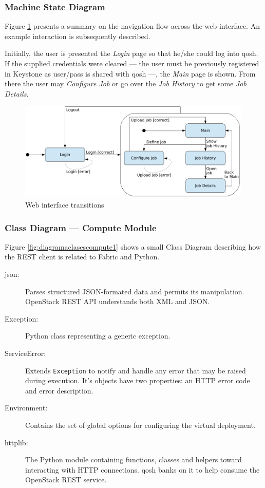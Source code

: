 \subsubsection{Machine State Diagram}\label{subsubsec:navegacion}
\noindent Figure \ref{fig:navegacion} presents a summary on the navigation flow across the web interface. An example interaction is subsequently described.

Initially, the user is presented the \emph{Login} page so that he/she could log into qosh. If the supplied credentials were cleared --- the user must be previously registered in Keystone as user/pass is shared with qosh ---, the \emph{Main} page is shown. From there the user may \emph{Configure Job} or go over the \emph{Job History} to get some \emph{Job Details}.

\begin{figure}[tbp]
\begin{center}
\includegraphics[width=0.99\textwidth]{imagenes/026.pdf}
 \caption{Web interface transitions}
\label{fig:navegacion}
\end{center}
\end{figure}

\subsubsection{Class Diagram --- Compute Module}\label{subsubsec:diagramaclasescompute}
\noindent Figure \ref{fig:diagramaclasescompute1} shows a small Class Diagram describing how the REST client is related to Fabric and Python.

\begin{description}
 \item[json:] Parses structured JSON-formated data and permits its manipulation. OpenStack REST API understands both XML and JSON.
 \item[Exception:] Python class representing a generic exception.
 \item[ServiceError:] Extends \texttt{Exception} to notify and handle any error that may be raised during execution. It's objects have two properties: an HTTP error code and error description.
 \item[Environment:] Contains the set of global options for configuring the virtual deployment.
 \item[httplib:] The Python module containing functions, classes and helpers toward interacting with HTTP connections. qosh banks on it to help consume the OpenStack REST service.
\end{description}

